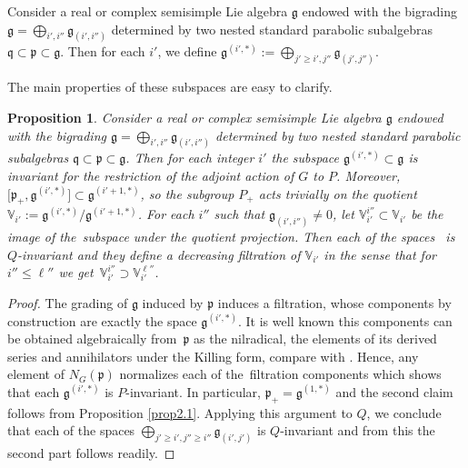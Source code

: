\documentclass[pdftex]{sigma}
\numberwithin{equation}{section}
\newtheorem{Proposition}[Theorem]{Proposition}
 { \theoremstyle{definition}
\newtheorem{Definition}[Theorem]{Definition}
\newtheorem{Example}[Theorem]{Example}
\newtheorem{Remark}[Theorem]{Remark} }
\def\frak{\mathfrak}
\def\Bbb{\mathbb}
\begin{document}
\begin{Definition}\label{def2.2}
 Consider a real or complex semisimple Lie algebra $\frak g$ endowed with the
 bigrading $\frak g=\bigoplus_{i',i''}\frak g_{(i',i'')}$ determined by two nested
 standard parabolic subalgebras $\frak q\subset\frak p\subset\frak g$. Then for each
 $i'$, we define $\frak g^{(i',*)}:=\bigoplus_{j'\geq i',j''}\frak g_{(j',j'')}$.
\end{Definition}

The main properties of these subspaces are easy to clarify.

\begin{Proposition}\label{prop2.2}
 Consider a real or complex semisimple Lie algebra $\frak g$ endowed with the
 bigrading $\frak g=\bigoplus_{i',i''}\frak g_{(i',i'')}$ determined by two nested
 standard parabolic subalgebras $\frak q\subset\frak p\subset\frak g$. Then for each
 integer $i'$ the subspace $\frak g^{(i',*)}\subset\frak g$ is invariant for the
 restriction of the adjoint action of $G$ to $P$. Moreover, $\bigl[\frak p_+,\frak
 g^{(i',*)}\bigr]\subset\frak g^{(i'+1,*)}$, so the subgroup $P_+$ acts trivially on the
 quotient $\Bbb V_{i'}:=\frak g^{(i',*)}/\frak g^{(i'+1,*)}$.
 For each $i''$ such that $\frak g_{(i',i'')}\neq 0$, let $\Bbb V^{i''}_{i'}\subset
 \Bbb V_{i'}$ be the image of the~subspace \smash{$\bigoplus_{j'\geq i',j''\geq i''}\frak
 g_{(j',j'')}\subset\frak g^{(i',*)}$} under the quotient projection. Then each of the
 spaces~\smash{$\Bbb V^{i''}_{i'}$} is $Q$-invariant and they define a decreasing filtration
 of $\Bbb V_{i'}$ in the sense that for $i''\leq \ell''$ we get~${\Bbb
 V^{i''}_{i'}\supset \Bbb V^{\ell''}_{i'}}$.
\end{Proposition}
\begin{proof}
 The grading of $\frak g$ induced by $\frak p$ induces a filtration, whose
 components by construction are exactly the space $\frak g^{(i',*)}$. It is well
 known this components can be obtained algebraically from~$\frak p$ as the
 nilradical, the elements of its derived series and annihilators under the Killing
 form, compare with \cite[Corollary 3.2.1]{book}. Hence, any element of $N_G(\frak
 p)$ normalizes each of the~filtration components which shows that each $\frak
 g^{(i',*)}$ is $P$-invariant. In particular, $\frak p_+=\frak g^{(1,*)}$ and the
 second claim follows from Proposition \ref{prop2.1}. Applying this argument to
 $Q$, we conclude that each of the spaces $\bigoplus_{j'\geq i',j''\geq i''}\frak
 g_{(i',j')}$ is $Q$-invariant and from this the second part follows readily.
\end{proof}
\end{document}
